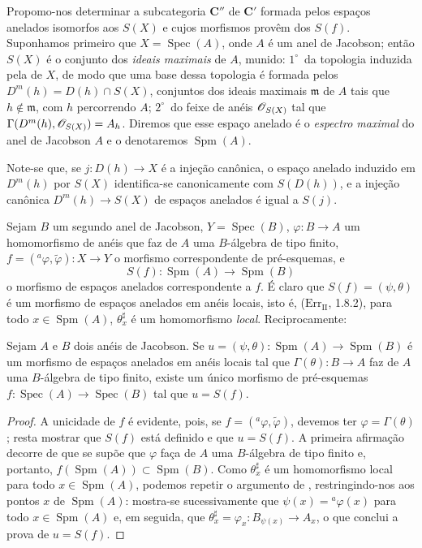 \begin{env}[10.9.3]
\label{IV.10.9.3}
Propomo-nos determinar a subcategoria $\mathbf{C}''$ de $\mathbf{C}'$ formada pelos espaços anelados isomorfos aos $S(X)$ e cujos morfismos provêm dos $S(f)$.
Suponhamos primeiro que $X=\operatorname{Spec}(A)$, onde $A$ é um anel de Jacobson; então $S(X)$ é o conjunto dos \emph{ideais maximais} de $A$, munido: $1^\circ$~da topologia induzida pela de $X$, de modo que uma base dessa topologia é formada pelos $D^m(h)=D(h)\cap S(X)$, conjuntos dos ideais maximais $\mathfrak m$ de $A$ tais que $h\notin\mathfrak m$, com $h$ percorrendo $A$; $2^\circ$~do feixe de anéis $\mathscr{O}_{S(X)}$ tal que $\Gamma(D^m(h),\mathscr{O}_{S(X)})=A_h$.
Diremos que esse espaço anelado é o \emph{espectro maximal} do anel de Jacobson $A$ e o denotaremos $\operatorname{Spm}(A)$.

Note-se que, se $j:D(h)\to X$ é a injeção canônica, o espaço anelado induzido em $D^m(h)$ por $S(X)$ identifica-se canonicamente com $S(D(h))$, e a injeção canônica $D^m(h)\to S(X)$ de espaços anelados é igual a $S(j)$.

Sejam $B$ um segundo anel de Jacobson, $Y=\operatorname{Spec}(B)$, $\varphi:B\to A$ um homomorfismo de anéis que faz de $A$ uma $B$-álgebra de tipo finito, $f=({}^a\varphi,\widetilde{\varphi}):X\to Y$ o morfismo correspondente de pré-esquemas, e
\[
  S(f):\operatorname{Spm}(A)\longrightarrow\operatorname{Spm}(B)
\]
o morfismo de espaços anelados correspondente a $f$.
É claro que $S(f)=(\psi,\theta)$ é um morfismo de espaços anelados em anéis locais, isto é, ($\mathrm{Err}_{\mathrm{II}}$, 1.8.2), para todo $x\in\operatorname{Spm}(A)$, $\theta_x^\sharp$ é um homomorfismo \emph{local}.
Reciprocamente:
\end{env}

\begin{proposition}[10.9.4]
\label{IV.10.9.4}
Sejam $A$ e $B$ dois anéis de Jacobson.
Se $u=(\psi,\theta):\operatorname{Spm}(A)\to\operatorname{Spm}(B)$ é um morfismo de espaços anelados em anéis locais tal que $\Gamma(\theta):B\to A$ faz de $A$ uma $B$-álgebra de tipo finito, existe um único morfismo de pré-esquemas $f:\operatorname{Spec}(A)\to\operatorname{Spec}(B)$ tal que $u=S(f)$.
\end{proposition}

\begin{proof}
A unicidade de $f$ é evidente, pois, se $f=({}^a\varphi,\widetilde{\varphi})$, devemos ter $\varphi=\Gamma(\theta)$; resta mostrar que $S(f)$ está definido e que $u=S(f)$.
A primeira afirmação decorre de que se supõe que $\varphi$ faça de $A$ uma $B$-álgebra de tipo finito e, portanto, $f(\operatorname{Spm}(A))\subset\operatorname{Spm}(B)$.
Como $\theta_x^\sharp$ é um homomorfismo local para todo $x\in\operatorname{Spm}(A)$, podemos repetir o argumento de , restringindo-nos aos pontos $x$ de $\operatorname{Spm}(A)$: mostra-se sucessivamente que $\psi(x)={}^a\varphi(x)$ para todo $x\in\operatorname{Spm}(A)$ e, em seguida, que $\theta_x^\sharp=\varphi_x:B_{\psi(x)}\to A_x$, o que conclui a prova de $u=S(f)$.
\end{proof}

